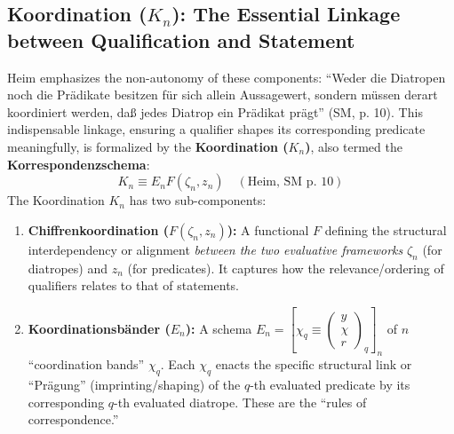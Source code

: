 \documentclass[
    12pt,              %
    a4paper,           %
    headings=normal,   %
    twoside=true,      %
    BCOR=8mm,          %
]{scrbook}
\newcommand{\q}[1]{\enquote{#1}}
\begin{document}
\subsection{\texorpdfstring{Koordination (\(K_n\)): The Essential Linkage between Qualification and Statement}{Koordination (Kn): The Essential Linkage between Qualification and Statement}}
\label{sec:ch1_koordination}
Heim emphasizes the non-autonomy of these components: \q{Weder die Diatropen noch die Prädikate besitzen für sich allein Aussagewert, sondern müssen derart koordiniert werden, daß jedes Diatrop ein Prädikat prägt} (SM, p. 10). This indispensable linkage, ensuring a qualifier shapes its corresponding predicate meaningfully, is formalized by the \textbf{Koordination (\(K_n\))}, also termed the \textbf{Korrespondenzschema}:
\[ K_n \equiv E_n F(\zeta_n, z_n) \quad (\text{Heim, SM p. 10}) \]
The Koordination \(K_n\) has two sub-components:
\begin{enumerate}
    \item  \textbf{Chiffrenkoordination (\(F(\zeta_n, z_n)\)):} A functional \(F\) defining the structural interdependency or alignment \textit{between the two evaluative frameworks} \(\zeta_n\) (for diatropes) and \(z_n\) (for predicates). It captures how the relevance/ordering of qualifiers relates to that of statements.
    \item  \textbf{Koordinationsbänder (\(E_n\)):} A schema \(E_n = \left[ \chi_q \equiv \begin{pmatrix} y \\ \chi \\ r \end{pmatrix}_q \right]_n\) of \(n\) \q{coordination bands} \(\chi_q\). Each \(\chi_q\) enacts the specific structural link or \q{Prägung} (imprinting/shaping) of the \(q\)-th evaluated predicate by its corresponding \(q\)-th evaluated diatrope. These are the \q{rules of correspondence.}
\end{enumerate}
\end{document}
